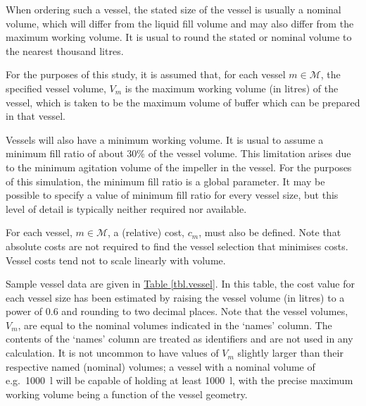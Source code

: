 When ordering such a vessel, the stated size of the vessel is usually a nominal
volume, which will differ from the liquid fill volume and may also differ from
the maximum working volume.
It is usual to round the stated or nominal volume to the nearest thousand
litres.

For the purposes of this study, it is assumed that, for each vessel
$m \in \mathcal{M}$, the specified vessel volume, $V_{m}$ is the maximum
working volume (in litres) of the vessel, which is taken to be the maximum
volume of buffer which can be prepared in that vessel.

Vessels will also have a minimum working volume.
It is usual to assume a minimum fill ratio of about 30\% of the vessel volume.
This limitation arises due to the minimum agitation volume of the impeller in
the vessel.
For the purposes of this simulation, the minimum fill ratio is a global
parameter.
It may be possible to specify a value of minimum fill ratio for every vessel
size, but this level of detail is typically neither required nor available.

For each vessel, $m \in \mathcal{M}$, a (relative) cost, $c_{m}$, must also be
defined.
Note that absolute costs are not required to find the vessel selection that
minimises costs.
Vessel costs tend not to scale linearly with volume.

Sample vessel data are given in \hyperref[tbl.vessel]{Table \ref*{tbl.vessel}}.
In this table, the cost value for each vessel size has been estimated by
raising the vessel volume (in litres) to a power of 0.6 and rounding to two
decimal places.
Note that the vessel volumes, $V_{m}$, are equal to the nominal volumes
indicated in the `names' column.  The contents of the `names' column are
treated as identifiers and are not used in any calculation.
It is not uncommon to have values of $V_{m}$ slightly larger than their
respective named (nominal) volumes; a vessel with a nominal volume of e.g.\
\SI{1000}{\litre} will be capable of holding at least \SI{1000}{\litre}, with
the precise maximum working volume being a function of the vessel geometry.


